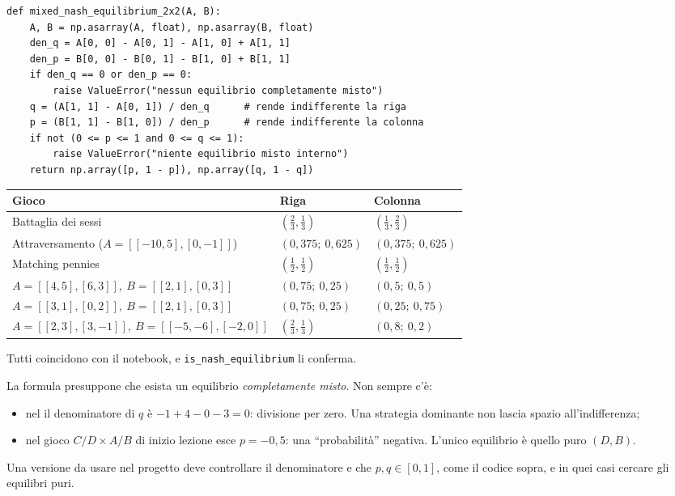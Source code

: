 \begin{lstlisting}
def mixed_nash_equilibrium_2x2(A, B):
    A, B = np.asarray(A, float), np.asarray(B, float)
    den_q = A[0, 0] - A[0, 1] - A[1, 0] + A[1, 1]
    den_p = B[0, 0] - B[0, 1] - B[1, 0] + B[1, 1]
    if den_q == 0 or den_p == 0:
        raise ValueError("nessun equilibrio completamente misto")
    q = (A[1, 1] - A[0, 1]) / den_q      # rende indifferente la riga
    p = (B[1, 1] - B[1, 0]) / den_p      # rende indifferente la colonna
    if not (0 <= p <= 1 and 0 <= q <= 1):
        raise ValueError("niente equilibrio misto interno")
    return np.array([p, 1 - p]), np.array([q, 1 - q])
\end{lstlisting}

\begin{center}
\renewcommand{\arraystretch}{1.2}
\small
\begin{tabular}{lll}
\toprule
Gioco & Riga & Colonna \\
\midrule
Battaglia dei sessi & $(\frac23, \frac13)$ & $(\frac13, \frac23)$ \\
Attraversamento ($A = [[-10,5],[0,-1]]$) & $(0{,}375;\ 0{,}625)$ & $(0{,}375;\ 0{,}625)$ \\
Matching pennies & $(\frac12, \frac12)$ & $(\frac12, \frac12)$ \\
$A = [[4,5],[6,3]],\ B = [[2,1],[0,3]]$ & $(0{,}75;\ 0{,}25)$ & $(0{,}5;\ 0{,}5)$ \\
$A = [[3,1],[0,2]],\ B = [[2,1],[0,3]]$ & $(0{,}75;\ 0{,}25)$ & $(0{,}25;\ 0{,}75)$ \\
$A = [[2,3],[3,-1]],\ B = [[-5,-6],[-2,0]]$ & $(\frac23, \frac13)$ & $(0{,}8;\ 0{,}2)$ \\
\bottomrule
\end{tabular}
\end{center}
Tutti coincidono con il notebook, e \texttt{is\_nash\_equilibrium} li conferma.

\begin{attenzione}
La formula presuppone che esista un equilibrio \emph{completamente misto}. Non sempre c'è:
\begin{itemize}
  \item nel  il denominatore di $q$ è
        $-1 + 4 - 0 - 3 = 0$: divisione per zero. Una strategia dominante non lascia
        spazio all'indifferenza;
  \item nel gioco $C/D\times A/B$ di inizio lezione esce $p = -0{,}5$: una
        ``probabilità'' negativa. L'unico equilibrio è quello puro $(D, B)$.
\end{itemize}
Una versione da usare nel progetto deve controllare il denominatore e che $p, q \in [0,1]$,
come il codice sopra, e in quei casi cercare gli equilibri puri.
\end{attenzione}

